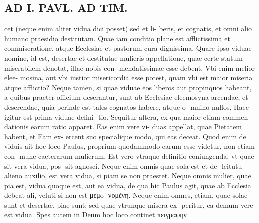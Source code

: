 \documentclass{article}
\begin{document}
\begin{pages}
\section*{AD I. PAVL. AD TIM. }
\marginpar{[ p.258 ]}\pstart cet (neque enim aliter vidua dici posset) sed et li- beris, et cognatis, et omni alio humano praesidio destitutam. Quae iam conditio plane est afflictissima et commiseratione, atque Ecclesiae et pastorum cura dignissima. Quare ipso viduae nomine, id est, desertae et destitutae mulieris appellatione, quae certe statum miserabilem denotat, illae nobis con- mendatissimae esse debent. Vbi enim melior elee- mosina, aut vbi iustior misericordia esse potest, quam vbi est maior miseria atque afflictio? Neque  tamen, si quae viduae eos liberos aut propinquos habeant, a quibus praeter officium deserantur, sunt ab Ecclesiae eleemosyna arcendae, et deserendae, quia perinde est tales cognatos habere, atque o- mnino nullos. Haec igitur est prima viduae defini- tio.  \pend\pstart Sequitur altera, ex qua maior etiam commen- dationis earum ratio apparet. Eas enim vere vi- duas appellat, quae Pietatem habent, et Eam ex- ercent suo specialique  modo, qui eas deceat. Quod enim de viduis ait hoc loco Paulus, proprium quodammodo earum esse videtur, non etiam con- mune caeterarum mulierum. Est vero vtraque definitio coniungenda, vt quae sit vera vidua, pos- sit agnosci. Neque  enim omnis quae sola est et de- leitutu alieno auxilio, est vera vidua, si piam se non praestet. Neque omnis mulier, quae pia est, vidua quoque est, aut ea vidua, de qua hic Paulus agit, quae ab Ecclesia debeat ali, veluti si non est μεμo- νομένη. Neque enim omnes, etiam, quae solae sunt et desertae, piae sunt: sed quae vtrunque misera ex- peritur, ea demum vere est vidua.  \pend\pstart Spes autem in Deum hoc loco continet πειγραφην  \pend

\end{pages}
\end{document}
